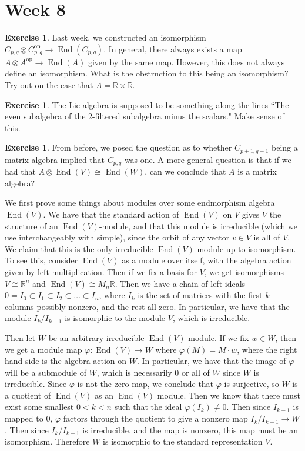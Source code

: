 \documentclass[psamsfonts]{amsart}
\theoremstyle{definition}
\newtheorem{exer}[thm]{Exercise}
\theoremstyle{remark}
\newcommand{\R}{\mathbb{R}}
\DeclareMathOperator{\End}{End}
\begin{document}
\section*{Week 8}
%
\begin{exer}
Last week, we constructed an isomorphism $C_{p,q} \otimes C_{p,q}^\text{op} \to \End(C_{p,q})$. In general, there always exists a map $A \otimes A^\text{op} \to \End(A)$ given by the same map. However, this does not always define an isomorphism. What is the obstruction to this being an isomorphism? Try out on the case that $A = \R \times \R$.
\end{exer}
%
\begin{exer}
The Lie algebra is supposed to be something along the lines ``The even subalgebra of the $2$-filtered subalgebra minus the scalars." Make sense of this.
\end{exer}
%
\begin{exer}
From before, we posed the question as to whether $C_{p+1,q+1}$ being a matrix algebra implied that $C_{p,q}$ was one. A more general question is that if we had that $A \otimes \End(V) \cong \End(W)$, can we conclude that $A$ is a matrix algebra? 
\end{exer}
%
We first prove some things about modules over some endmorphism algebra $\End(V)$. We have that the standard action of $\End(V)$ on $V$ gives $V$ the structure of an $\End(V)$-module, and that this module is irreducible (which we use interchangeably with simple), since the orbit of any vector $v \in V$ is all of $V$. We claim that this is the only irreducible $\End(V)$ module up to isomorphism. To see this, consider $\End(V)$ as a module over itself, with the algebra action given by left multiplication. Then if we fix a basis for $V$, we get isomorphisms $V \cong \R^n$ and $\End(V) \cong M_n\R$. Then we have a chain of left ideals $0 = I_0 \subset I_1 \subset I_2 \subset \ldots \subset  I_n$, where $I_k$ is the set of matrices with the first $k$ columns possibly nonzero, and the rest all zero. In particular, we have that the module $I_k / I_{k-1}$ is isomorphic to the module $V$, which is irreducible.

Then let $W$ be an arbitrary irreducible $\End(V)$-module. If we fix $w \in W$, then we get a module map $\varphi : \End(V) \to W$ where $\varphi(M) = M \cdot w$, where the right hand side is the algebra action on $W$. In particular, we have that the image of $\varphi$ will be a submodule of $W$, which is necessarily $0$ or all of $W$ since $W$ is irreducible. Since $\varphi$ is not the zero map, we conclude that $\varphi$ is surjective, so $W$ is a quotient of $\End(V)$ as an $\End(V)$ module. Then we know that there must exist some smallest $0 < k < n$ such that the ideal $\varphi(I_k) \neq 0$. Then since $I_{k-1}$ is mapped to $0$, $\varphi$ factors through the quotient to give a nonzero map $I_k / I_{k-1} \to W$. Then since $I_k / I_{k-1}$ is irreducible, and the map is nonzero, this map must be an isomorphism. Therefore $W$ is isomorphic to the standard representation $V$.
\end{document}
